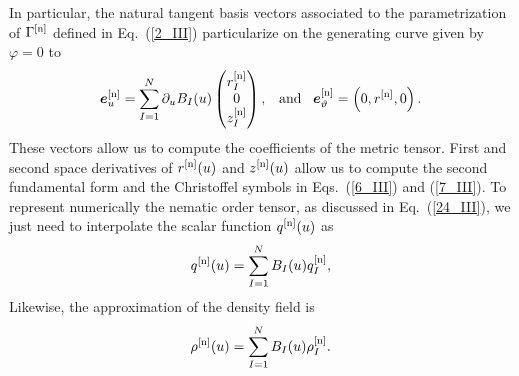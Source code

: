 {In particular, the natural tangent basis vectors associated to the parametrization of $\Gamma^{[\textup{n}]}$ defined in Eq.~(\ref{2_III}) particularize on the generating curve given by $\varphi=0$ to
\begin{equation} \label{17_III}
    \bm{e}_{u}^{[\textup{n}]} = \sum_{I=1}^{N}  \partial_{u} B_{I} (u) \begin{pmatrix}
	r_I^{[\textup{n}]}\\ 
	0\\
	z_I^{[\textup{n}]}
\end{pmatrix}, \;\;\; \mbox{and}\;\;\; \bm{e}_{\vartheta}^{[\textup{n}]} = \left(0,r^{[\textup{n}]},0\right).
\end{equation}
These vectors allow us to compute the coefficients of the metric tensor. First and second space derivatives of $r^{[\textup{n}]}(u)$ and $z^{[\textup{n}]}(u)$ allow us to compute the second fundamental form and the Christoffel symbols in Eqs.~(\ref{6_III}) and (\ref{7_III}). To represent numerically the nematic order tensor, as discussed in Eq.~(\ref{24_III}), we just need to interpolate the scalar function  $q^{[\textup{n}]}(u)$ as 
\begin{equation} \label{27_III}
    q^{[\textup{n}]}(u)=  \sum_{I=1}^{N} B_{I}(u)q_{I}^{[\textup{n}]},
\end{equation}
Likewise, the approximation of the density field is  
\begin{align} \label{30_III}
 \rho^{[\textup{n}]}(u)=  \sum_{I=1}^{N} B_{I}(u)\rho_{I}^{[\textup{n}]}.
\end{align}

}
